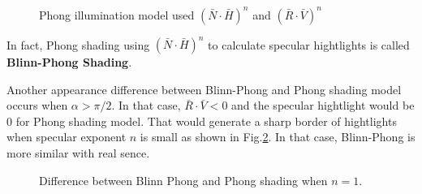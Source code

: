 \documentclass[12pt,a4paper]{article}
\makeatletter
\newtheorem*{solution}{Solution}
\theoremstyle{definition}
\numberwithin{equation}{section}
\numberwithin{figure}{section}
\renewenvironment{solution}[1][Solution] {\par\pushQED{\qed}\normalfont\topsep6\p@\@plus6\p@\relax\trivlist\item[\hskip\labelsep\bfseries#1\@addpunct{.}]\ignorespaces}{\popQED\endtrivlist\@endpefalse} \makeatother
\makeatother
\begin{document}
\begin{solution}
	\begin{figure}[h]
		\centering
	\caption{Phong illumination model used $(\bar{N}\cdot \bar{H})^n$ and $(\bar{R}\cdot \bar{V})^n$\cite{phongwiki}}
	\label{fig2}
	\end{figure}

	In fact, Phong shading using $(\bar{N}\cdot \bar{H})^n$ to calculate specular hightlights is called \textbf{Blinn-Phong Shading}\cite{phongwiki}.
	
	Another appearance difference between Blinn-Phong and Phong shading model occurs when $\alpha > \pi/2$. In that case, $\bar{R}\cdot \bar{V} < 0$ and the specular hightlight would be $0$ for Phong shading model. That would generate a sharp border of hightlights when specular exponent $n$ is small as shown in Fig.\ref{fig3}. In that case, Blinn-Phong is more similar with real sence.
	
	\begin{figure}[h]
		\centering
		\caption{Difference between Blinn Phong and Phong shading when $n=1$.\cite{blog}}
		\label{fig3}
	\end{figure}
	
\end{solution}
\end{document}
